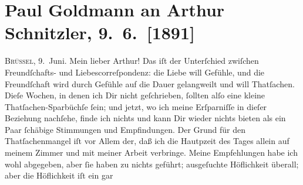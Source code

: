 

         
         \renewcommand{\erwaehntePersonen}{Personen:  ?? [Leiter einer Glasfabrik],  ?? [Schwester eines Glasfabrikanten], Richard Beer-Hofmann, Marie Glümer, Clementine Goldmann, Hugo von Hofmannsthal, Jacob Jordaens, Friedrich Kapper, Fedor Mamroth, Peter Paul Rubens, Charles Tardieu, Boris Van-Jung, Richard Wagner, Olga Waissnix}
         \renewcommand{\erwaehnteInstitutionen}{Institutionen: ?? [Glasfabrik in Belgien], Frankfurter Zeitung, L’Indépendance Belge, Musées royaux des Beaux-Arts de Belgique}
         \renewcommand{\erwaehnteOrte}{Orte: Belgien, Brünn, Brüssel, Frankfurt am Main, Niederlande, Spanien, Wien, rue des Plantes}
         \renewcommand{\erwaehnteWerke}{}
               \section[Paul Goldmann an Arthur Schnitzler, 9. 6. {[}1891{]}]{ Paul Goldmann an Arthur Schnitzler, 9. 6. {[}1891{]}}\nopagebreak{}\rehead{ }\begin{ledgroupsized}[t]{13cm}\normalsize\beginnumbering \toendnotes[C]{\smallbreak\pagebreak[2]} 
\toendnotes[C]{\smallbreak}\pstart
           \raggedleft{}{\pb}\textsc{Brüssel}, 9. Juni.\pend
           \pstart\center{}Mein lieber Arthur!\pend\pstart
           Das iſt der Unterſchied zwiſchen Freundſchafts- und Liebescorreſpondenz: die Liebe
               will Gefühle, und die Freundſchaft wird durch Gefühle auf die Dauer gelangweilt und
               will Thatſachen. Dieſe Wochen, in denen ich Dir nicht geſchrieben, ſollten alſo eine
               kleine Thatſachen-Sparbüchſe ſein; und jetzt, wo ich meine Erſparniſſe in dieſer
               Beziehung nachſehe, finde ich nichts und kann Dir wieder nichts bieten als ein Paar
               ſchäbige Stimmungen und Empfindungen. Der Grund für den Thatſachenmangel iſt vor
               Allem der, daß ich die Hautpzeit des Tages allein auf meinem Zimmer und mit meiner
               Arbeit verbringe. Meine Empfehlungen habe ich wohl abgegeben, aber ſie haben zu
               nichts geführt; ausgeſuchte Höflichkeit überall; aber die Höflichkeit iſt ein gar

\end{ledgroupsized}
